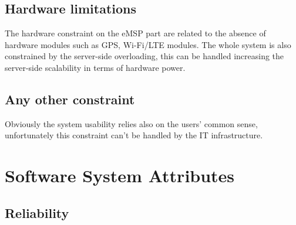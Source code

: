 \subsection{Hardware limitations}
The hardware constraint on the eMSP part are related to the absence of hardware modules such as GPS, Wi-Fi/LTE modules. The whole system is also constrained by the server-side overloading, this can be handled increasing the server-side scalability in terms of hardware power.
\subsection{Any other constraint}
Obviously the system usability relies also on the users' common sense, unfortunately this constraint can't be handled by the IT infrastructure.
\section{Software System Attributes}
\subsection{Reliability}
\begin{table}[H]
\end{table}
